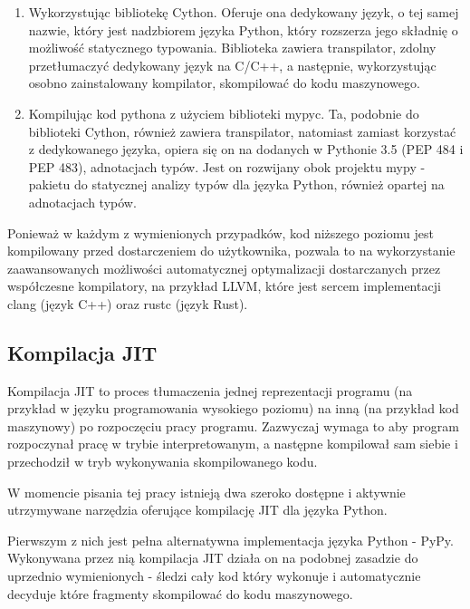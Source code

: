 \documentclass[11pt, a4paper]{article}
\begin{document}
\begin{sloppypar}
\begin{enumerate}
      \item Wykorzystując bibliotekę Cython\cite{Cython_Org}\cite{Cython_The_Best_Of_Both}.
        Oferuje ona dedykowany język, o tej samej nazwie, który jest nadzbiorem języka
        Python, który rozszerza jego składnię o możliwość statycznego typowania.
        Biblioteka zawiera transpilator, zdolny przetłumaczyć dedykowany język na C/C++,
        a następnie, wykorzystując osobno zainstalowany kompilator, skompilować do kodu
        maszynowego.

      \item Kompilując kod pythona z użyciem biblioteki mypyc\cite{mypyc}. Ta, podobnie
        do biblioteki Cython, również zawiera transpilator, natomiast zamiast korzystać
        z dedykowanego języka, opiera się on na dodanych w Pythonie 3.5\cite{Python_3_5}
        (PEP 484\cite{PEP_484} i PEP 483\cite{PEP_483}), adnotacjach typów. Jest on
        rozwijany obok projektu mypy - pakietu do statycznej analizy typów dla języka
        Python, również opartej na adnotacjach typów\cite{mypy}.
    \end{enumerate}

    Ponieważ w każdym z wymienionych przypadków, kod niższego poziomu jest kompilowany
    przed dostarczeniem do użytkownika, pozwala to na wykorzystanie zaawansowanych możliwości
    automatycznej optymalizacji dostarczanych przez współczesne kompilatory, na przykład
    LLVM, które jest sercem implementacji clang (język C++) oraz rustc (język Rust).

    \subsection{Kompilacja JIT}
    Kompilacja JIT to proces tłumaczenia jednej reprezentacji programu (na przykład w
    języku programowania wysokiego poziomu) na inną (na przykład kod maszynowy) po rozpoczęciu
    pracy programu. Zazwyczaj wymaga to aby program rozpoczynał pracę w trybie
    interpretowanym, a następne kompilował sam siebie i przechodził w tryb wykonywania skompilowanego
    kodu.

    W momencie pisania tej pracy istnieją dwa szeroko dostępne i aktywnie utrzymywane narzędzia
    oferujące kompilację JIT dla języka Python.

    Pierwszym z nich jest pełna alternatywna implementacja języka Python - PyPy\cite{PyPy_Home_Page}.
    Wykonywana przez nią kompilacja JIT działa on na podobnej zasadzie do uprzednio wymienionych
    - śledzi cały kod który wykonuje i automatycznie decyduje które fragmenty skompilować
    do kodu maszynowego\cite{PyPy_JIT}.


\end{sloppypar}
\end{document}
